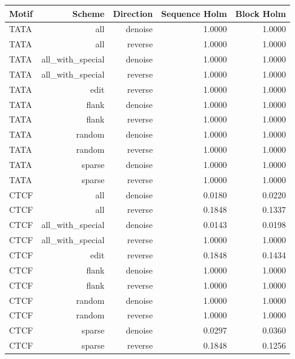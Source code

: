 \begin{tabular}{lrrrr}
\toprule
Motif & Scheme & Direction & Sequence Holm & Block Holm \\
\midrule
TATA & all & denoise & 1.0000 & 1.0000 \\
TATA & all & reverse & 1.0000 & 1.0000 \\
TATA & all\_with\_special & denoise & 1.0000 & 1.0000 \\
TATA & all\_with\_special & reverse & 1.0000 & 1.0000 \\
TATA & edit & reverse & 1.0000 & 1.0000 \\
TATA & flank & denoise & 1.0000 & 1.0000 \\
TATA & flank & reverse & 1.0000 & 1.0000 \\
TATA & random & denoise & 1.0000 & 1.0000 \\
TATA & random & reverse & 1.0000 & 1.0000 \\
TATA & sparse & denoise & 1.0000 & 1.0000 \\
TATA & sparse & reverse & 1.0000 & 1.0000 \\
CTCF & all & denoise & 0.0180 & 0.0220 \\
CTCF & all & reverse & 0.1848 & 0.1337 \\
CTCF & all\_with\_special & denoise & 0.0143 & 0.0198 \\
CTCF & all\_with\_special & reverse & 1.0000 & 1.0000 \\
CTCF & edit & reverse & 0.1848 & 0.1434 \\
CTCF & flank & denoise & 1.0000 & 1.0000 \\
CTCF & flank & reverse & 1.0000 & 1.0000 \\
CTCF & random & denoise & 1.0000 & 1.0000 \\
CTCF & random & reverse & 1.0000 & 1.0000 \\
CTCF & sparse & denoise & 0.0297 & 0.0360 \\
CTCF & sparse & reverse & 0.1848 & 0.1256 \\
\bottomrule
\end{tabular}